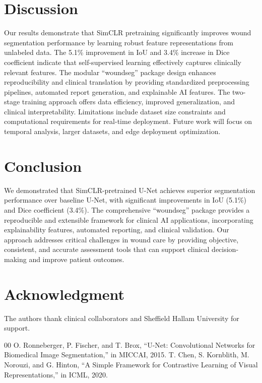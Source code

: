\documentclass[conference]{IEEEtran}
\begin{document}
\section{Discussion}
Our results demonstrate that SimCLR pretraining significantly improves wound segmentation performance by learning robust feature representations from unlabeled data. The 5.1\% improvement in IoU and 3.4\% increase in Dice coefficient indicate that self-supervised learning effectively captures clinically relevant features. The modular ``woundseg'' package design enhances reproducibility and clinical translation by providing standardized preprocessing pipelines, automated report generation, and explainable AI features. The two-stage training approach offers data efficiency, improved generalization, and clinical interpretability. Limitations include dataset size constraints and computational requirements for real-time deployment. Future work will focus on temporal analysis, larger datasets, and edge deployment optimization.

\section{Conclusion}
We demonstrated that SimCLR-pretrained U-Net achieves superior segmentation performance over baseline U-Net, with significant improvements in IoU (5.1\%) and Dice coefficient (3.4\%). The comprehensive ``woundseg'' package provides a reproducible and extensible framework for clinical AI applications, incorporating explainability features, automated reporting, and clinical validation. Our approach addresses critical challenges in wound care by providing objective, consistent, and accurate assessment tools that can support clinical decision-making and improve patient outcomes.

\section*{Acknowledgment}
The authors thank clinical collaborators and Sheffield Hallam University for support.

\begin{thebibliography}{00}
 O. Ronneberger, P. Fischer, and T. Brox, ``U-Net: Convolutional Networks for Biomedical Image Segmentation,'' in MICCAI, 2015.
 T. Chen, S. Kornblith, M. Norouzi, and G. Hinton, ``A Simple Framework for Contrastive Learning of Visual Representations,'' in ICML, 2020.
\end{thebibliography}
\end{document}
